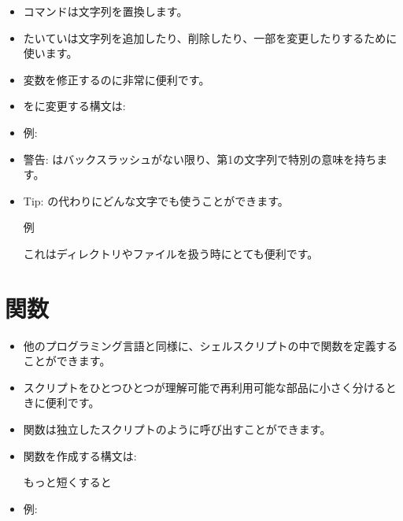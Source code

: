 \documentclass{jsarticle}
\begin{document}
\begin{itemize}

\item {\color{red}}コマンドは文字列を置換します。
\item たいていは文字列を追加したり、削除したり、一部を変更したりするために使います。
\item 変数を修正するのに非常に便利です。

\item {\color{red}}を{\color{red}}に変更する構文は:

{\color{red}}

\item 例:
{\color{red}{\tt
\$ v="im*.nii.gz"

\$ v=`echo \$v | sed s/im/Subject/g`

\$ echo \$v

　Subject1.nii.gz Subject2.nii.gz Subject3.nii.gz 
}}

\item 警告: {\color{red}}はバックスラッシュがない限り、第1の文字列で特別の意味を持ちます。
\item Tip: {\color{red}\Q{/}}の代わりにどんな文字でも使うことができます。

例　{\color{red}}

これはディレクトリやファイルを扱う時にとても便利です。

\end{itemize}


\section{関数}


\begin{itemize}

\item 他のプログラミング言語と同様に、シェルスクリプトの中で関数を定義することができます。
\item スクリプトをひとつひとつが理解可能で再利用可能な部品に小さく分けるときに便利です。
\item 関数は独立したスクリプトのように呼び出すことができます。

\bigskip

\item 関数を作成する構文は:

{}

もっと短くすると

{}

\bigskip

\item 例:

{}

\end{itemize}
\end{document}
